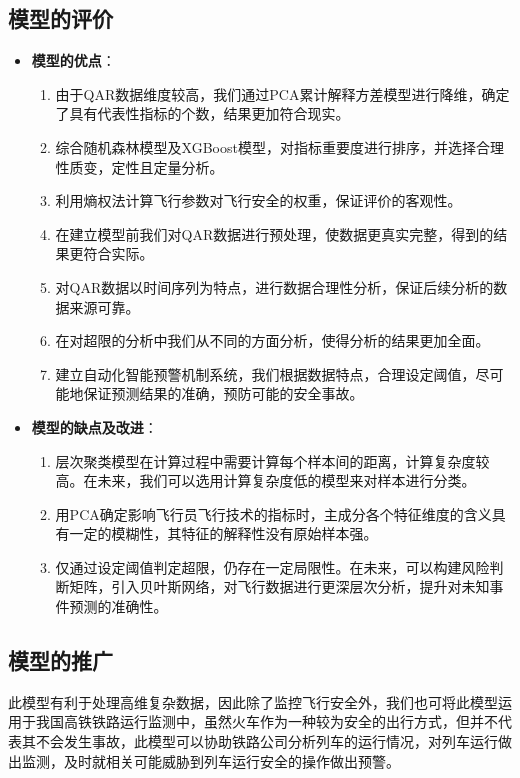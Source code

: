 \documentclass{MathorCupModeling}
\begin{document}
	\subsection{模型的评价}
	\begin{itemize}
		\item \textbf{模型的优点}：
			\begin{enumerate}
				\item 由于QAR数据维度较高，我们通过PCA累计解释方差模型进行降维，确定了具有代表性指标的个数，结果更加符合现实。
				\item 综合随机森林模型及XGBoost模型，对指标重要度进行排序，并选择合理性质变，定性且定量分析。
				\item 利用熵权法计算飞行参数对飞行安全的权重，保证评价的客观性。
				\item 在建立模型前我们对QAR数据进行预处理，使数据更真实完整，得到的结果更符合实际。
				\item 对QAR数据以时间序列为特点，进行数据合理性分析，保证后续分析的数据来源可靠。
				\item 在对超限的分析中我们从不同的方面分析，使得分析的结果更加全面。
				\item 建立自动化智能预警机制系统，我们根据数据特点，合理设定阈值，尽可能地保证预测结果的准确，预防可能的安全事故。
			\end{enumerate}
		\item \textbf{模型的缺点及改进}：
			\begin{enumerate}
				\item 层次聚类模型在计算过程中需要计算每个样本间的距离，计算复杂度较高。在未来，我们可以选用计算复杂度低的模型来对样本进行分类。
				\item 用PCA确定影响飞行员飞行技术的指标时，主成分各个特征维度的含义具有一定的模糊性，其特征的解释性没有原始样本强。
				\item 仅通过设定阈值判定超限，仍存在一定局限性。在未来，可以构建风险判断矩阵，引入贝叶斯网络，对飞行数据进行更深层次分析，提升对未知事件预测的准确性。
			\end{enumerate}
	\end{itemize}
	\subsection{模型的推广}
	此模型有利于处理高维复杂数据，因此除了监控飞行安全外，我们也可将此模型运用于我国高铁铁路运行监测中，虽然火车作为一种较为安全的出行方式，但并不代表其不会发生事故，此模型可以协助铁路公司分析列车的运行情况，对列车运行做出监测，及时就相关可能威胁到列车运行安全的操作做出预警。
	
\end{document}
